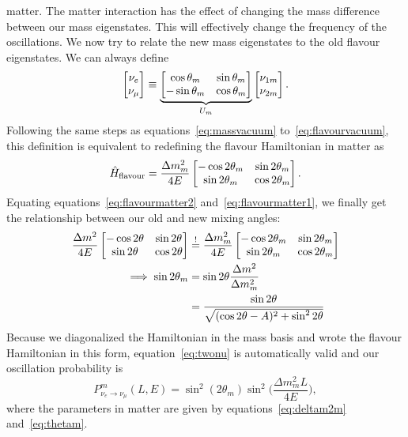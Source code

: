 matter. The matter interaction has the effect of changing the mass difference
between our mass eigenstates. This will effectively change the frequency of the
oscillations. We now try to relate the new mass eigenstates to the old flavour
eigenstates. We can always define
$$\begin{bmatrix}\nu_e \\ \nu_\mu\end{bmatrix} \equiv \underbrace{\begin{bmatrix}\cos \theta_m & \sin \theta_m \\ -\sin
\theta_m & \cos \theta_m\end{bmatrix}}_{U_m} \begin{bmatrix}\nu_{1m} \\ \nu_{2m}\end{bmatrix}.$$
Following the same steps as equations~\ref{eq:massvacuum}
to~\ref{eq:flavourvacuum}, this definition is equivalent to redefining the
flavour Hamiltonian in matter as
\begin{equation}\hat{H}_\text{flavour} = \frac{\Delta m^2_m}{4 E} \begin{bmatrix}-\cos 2\theta_m &
\sin 2\theta_m \\ \sin 2\theta_m & \cos 2\theta_m\end{bmatrix}.\label{eq:flavourmatter2}\end{equation}
Equating equations~\ref{eq:flavourmatter2} and~\ref{eq:flavourmatter1}, we
finally get the relationship between our old and new mixing angles:
\begin{align}
	\frac{\Delta m^2}{4 E} \bmat{-\cos 2\theta & \sin 2\theta \\ \sin 2\theta &
	\cos 2\theta} &\overset{!}{=} \frac{\Delta m^2_m}{4 E} \bmat{-\cos 2\theta_m &
	\sin 2\theta_m \\ \sin 2\theta_m & \cos 2\theta_m} \nonumber\\\implies
	\sin 2\theta_m &= \sin 2\theta \frac{\Delta m^2}{\Delta m^2_m}\nonumber\\
	&= \frac{\sin 2\theta}{
		\sqrt{(\cos 2\theta - A)^2 + \sin^2 2\theta}}\label{eq:thetam}%
\end{align}
Because we diagonalized the Hamiltonian in the mass basis and wrote the flavour
Hamiltonian in this form, equation~\ref{eq:twonu} is automatically valid and
our oscillation probability is
\begin{equation}
	P^m_{\nu_e \rightarrow \nu_\mu}(L, E) = \sin^2(2\theta_m)
	\sin^2\bigg(\frac{\Delta m^2_m L}{4 E}\bigg),\label{eq:twonumatter}
\end{equation}
where the parameters in matter are given by equations~\ref{eq:deltam2m}
and~\ref{eq:thetam}.

